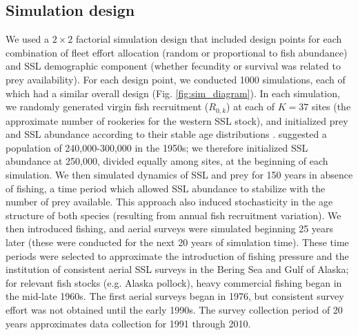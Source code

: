 \documentclass[nonumbib,leqno]{nrc1}
\begin{document}
\subsection{Simulation design}

We used a $2 \times 2$ factorial simulation design that included design points for each combination of fleet effort allocation (random or proportional to fish abundance) and SSL demographic component (whether fecundity or survival was related to prey availability).  For each design point, we conducted 1000 simulations, each of which had a similar overall design (Fig. \ref{fig:sim_diagram}).
In each simulation, we randomly generated virgin fish recruitment ($R_{0,k}$) at each of $K=37$ sites (the approximate number of rookeries for the western SSL stock), and initialized prey and SSL abundance according to their stable age distributions \citep[cf.][]{Caswell2001}.  \citet{LoughlinEtAl1992} suggested a population of 240,000-300,000 in the 1950s; we therefore initialized SSL abundance at 250,000, divided equally among sites, at the beginning of each simulation.  We then simulated dynamics of SSL and prey for 150 years in absence of fishing, a time period which allowed SSL abundance to stabilize with the number of prey available.  This approach also induced stochasticity in the age structure of both species (resulting from annual fish recruitment variation).  We then introduced fishing, and aerial surveys were simulated beginning 25 years later (these were conducted for the next 20 years of simulation time).  These time periods were selected to approximate the introduction of fishing pressure and the institution of consistent aerial SSL surveys in the Bering Sea and Gulf of Alaska; for relevant fish stocks (e.g. Alaska pollock), heavy commercial fishing began in the mid-late 1960s. The first aerial surveys began in 1976, but consistent survey effort was not obtained until the early 1990s.  The survey collection period of 20 years approximates data collection for 1991 through 2010.
\end{document}
